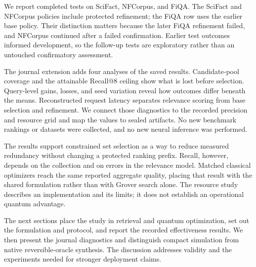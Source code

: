 We report completed tests on SciFact, NFCorpus, and FiQA. The SciFact and NFCorpus policies include protected refinement; the FiQA row uses the earlier base policy. Their distinction matters because the later FiQA refinement failed, and NFCorpus continued after a failed confirmation. Earlier test outcomes informed development, so the follow-up tests are exploratory rather than an untouched confirmatory assessment.

The journal extension adds four analyses of the saved results. Candidate-pool coverage and the attainable Recall@8 ceiling show what is lost before selection. Query-level gains, losses, and seed variation reveal how outcomes differ beneath the means. Reconstructed request latency separates relevance scoring from base selection and refinement. We connect those diagnostics to the recorded precision and resource grid and map the values to sealed artifacts. No new benchmark rankings or datasets were collected, and no new neural inference was performed.

The results support constrained set selection as a way to reduce measured redundancy without changing a protected ranking prefix. Recall, however, depends on the collection and on errors in the relevance model. Matched classical optimizers reach the same reported aggregate quality, placing that result with the shared formulation rather than with Grover search alone. The resource study describes an implementation and its limits; it does not establish an operational quantum advantage.

The next sections place the study in retrieval and quantum optimization, set out the formulation and protocol, and report the recorded effectiveness results. We then present the journal diagnostics and distinguish compact simulation from native reversible-oracle synthesis. The discussion addresses validity and the experiments needed for stronger deployment claims.
